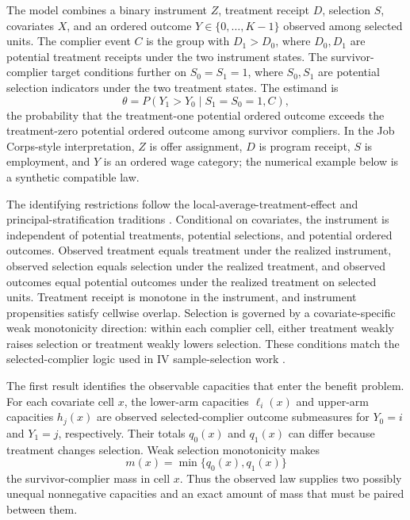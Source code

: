 The model combines a binary instrument \(Z\), treatment receipt \(D\), selection \(S\), covariates \(X\), and an ordered outcome \(Y\in\{0,\ldots,K-1\}\) observed among selected units.  The complier event \(C\) is the group with \(D_1>D_0\), where \(D_0,D_1\) are potential treatment receipts under the two instrument states.  The survivor-complier target conditions further on \(S_0=S_1=1\), where \(S_0,S_1\) are potential selection indicators under the two treatment states.  The estimand is
\[
\theta
=
P(Y_1>Y_0\mid S_1=S_0=1,C),
\]
the probability that the treatment-one potential ordered outcome exceeds the treatment-zero potential ordered outcome among survivor compliers.  In the Job Corps-style interpretation, \(Z\) is offer assignment, \(D\) is program receipt, \(S\) is employment, and \(Y\) is an ordered wage category; the numerical example below is a synthetic compatible law.

The identifying restrictions follow the local-average-treatment-effect and principal-stratification traditions \citep{ImbensAngrist1994,AngristImbensRubin1996,FrangakisRubin2002}.  Conditional on covariates, the instrument is independent of potential treatments, potential selections, and potential ordered outcomes.  Observed treatment equals treatment under the realized instrument, observed selection equals selection under the realized treatment, and observed outcomes equal potential outcomes under the realized treatment on selected units.  Treatment receipt is monotone in the instrument, and instrument propensities satisfy cellwise overlap.  Selection is governed by a covariate-specific weak monotonicity direction: within each complier cell, either treatment weakly raises selection or treatment weakly lowers selection.  These conditions match the selected-complier logic used in IV sample-selection work \citep{ChenFlores2015,KennedyHarrisKeele2019,DongHeiler2026}.

The first result identifies the observable capacities that enter the benefit problem.  For each covariate cell \(x\), the lower-arm capacities \(\ell_i(x)\) and upper-arm capacities \(h_j(x)\) are observed selected-complier outcome submeasures for \(Y_0=i\) and \(Y_1=j\), respectively.  Their totals \(q_0(x)\) and \(q_1(x)\) can differ because treatment changes selection.  Weak selection monotonicity makes
\[
m(x)=\min\{q_0(x),q_1(x)\}
\]
the survivor-complier mass in cell \(x\).  Thus the observed law supplies two possibly unequal nonnegative capacities and an exact amount of mass that must be paired between them.

